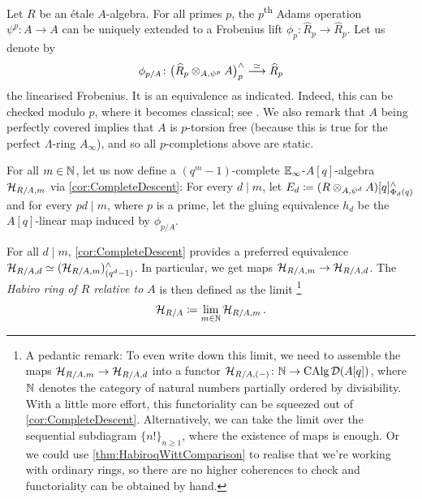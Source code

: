 \documentclass[DIV=12,numbers=enddot,leqno,bibliography=totoc]{scrartcl}
\begin{document}
	\begin{numpar}\label{con:RelativeHabiroRing}
		Let $R$ be an étale $A$-algebra. For all primes $p$, the $p$\textsuperscript{th} Adams operation $\psi^p\colon A\rightarrow A$ can be uniquely extended to a Frobenius lift $\phi_p\colon \widehat{R}_p\rightarrow \widehat{R}_p$. Let us denote by
		\begin{equation*}
			\phi_{p/A}\colon \bigl(\widehat{R}_p\otimes_{A,\psi^p}A\bigr)_p^\complete\overset{\simeq}{\longrightarrow}\widehat{R}_p
		\end{equation*}
		the linearised Frobenius. It is an equivalence as indicated. Indeed, this can be checked modulo $p$, where it becomes classical; see \cite[]{Stacks}. We also remark that $A$ being perfectly covered implies that $A$ is $p$-torsion free (because this is true for the perfect $\Lambda$-ring $A_\infty$), and so all $p$-completions above are static.
		
		For all $m\in\mathbb{N}$, let us now define a $(q^m-1)$-complete $\mathbb{E}_\infty$-$A[q]$-algebra $\mathcal{H}_{R/A,  m}$ via \cref{cor:CompleteDescent}: For every $d\mid m$, let $E_d\coloneqq (R\otimes_{A,\psi^d}A)[q]_{\Phi_d(q)}^\complete$ and for every $pd\mid m$, where $p$ is a prime, let the gluing equivalence $h_d$ be the $A[q]$-linear map induced by $\phi_{p/A}$.
		
		For all $d\mid m$, \cref{cor:CompleteDescent} provides a preferred equivalence $\mathcal{H}_{R/A,  d}\simeq (\mathcal{H}_{R/A,  m})_{(q^d-1)}^\wedge$. In particular, we get maps $\mathcal{H}_{R/A,  m}\rightarrow \mathcal{H}_{R/A,  d}$. The \emph{Habiro ring of $R$ relative to $A$} is then defined as the limit%
		\footnote{A pedantic remark: To even write down this limit, we need to assemble the maps $\mathcal{H}_{R/A,  m}\rightarrow \mathcal{H}_{R/A,  d}$ into a functor $\Hh_{R/A,  (-)}\colon \IN\rightarrow \CAlg \Dd(A[q])$, where $\mathbb{N}$ denotes the category of natural numbers partially ordered by divisibility. With a little more effort, this functoriality can be squeezed out of \cref{cor:CompleteDescent}. Alternatively, we can take the limit over the sequential subdiagram $\{n!\}_{n\geqslant 1}$, where the existence of maps is enough. Or we could use \cref{thm:HabiroqWittComparison} to realise that we're working with ordinary rings, so there are no higher coherences to check and functoriality can be obtained by hand.}
		\begin{equation*}
			\Hh_{R/A}\coloneqq \limit_{m\in\IN}\Hh_{R/A,  m}\,.
		\end{equation*}
	\end{numpar}
\end{document}
